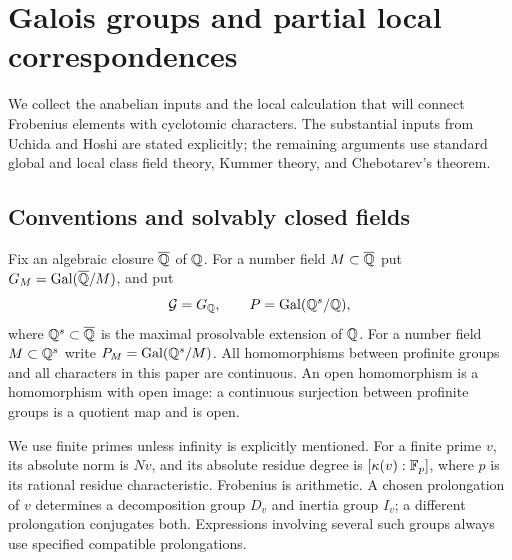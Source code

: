 \section{Galois groups and partial local correspondences}\label{sec:preliminaries}

We collect the anabelian inputs and the local calculation that will connect Frobenius elements with cyclotomic characters. The substantial inputs from Uchida and Hoshi are stated explicitly; the remaining arguments use standard global and local class field theory, Kummer theory, and Chebotarev's theorem.

\subsection{Conventions and solvably closed fields}
Fix an algebraic closure $\overline{\mathbb Q}$ of $\mathbb Q$. For a number field $M\subset\overline{\mathbb Q}$ put $G_M=\operatorname{Gal}(\overline{\mathbb Q}/M)$, and put
\[
 \mathcal G=G_{\mathbb Q},\qquad
 P=\operatorname{Gal}(\mathbb Q^s/\mathbb Q),
\]
where $\mathbb Q^s\subset\overline{\mathbb Q}$ is the maximal prosolvable extension of $\mathbb Q$. For a number field $M\subset\mathbb Q^s$ write $P_M=\operatorname{Gal}(\mathbb Q^s/M)$. All homomorphisms between profinite groups and all characters in this paper are continuous. An open homomorphism is a homomorphism with open image: a continuous surjection between profinite groups is a quotient map and is open.

We use finite primes unless infinity is explicitly mentioned. For a finite prime $v$, its absolute norm is $Nv$, and its absolute residue degree is $[\kappa(v):\mathbb F_p]$, where $p$ is its rational residue characteristic. Frobenius is arithmetic. A chosen prolongation of $v$ determines a decomposition group $D_v$ and inertia group $I_v$; a different prolongation conjugates both. Expressions involving several such groups always use specified compatible prolongations.

